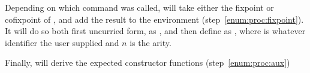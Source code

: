 Depending on which command was called,  will take either the fixpoint or cofixpoint of , and
add the result to the environment (step~\ref{enum:proc:fixpoint}). It will do so both first uncurried form, as , and
then define  as , where  is whatever identifier the
user supplied and $n$ is the arity.

Finally,  will derive the expected constructor functions (step~\ref{enum:proc:aux})


  
  
  
  





